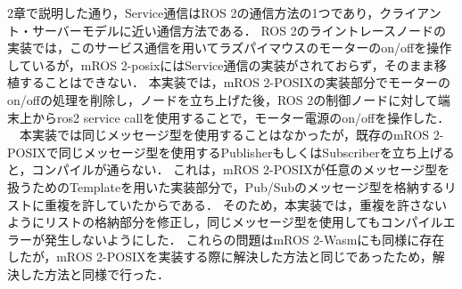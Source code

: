 2章で説明した通り，Service通信はROS 2の通信方法の1つであり，クライアント・サーバーモデルに近い通信方法である．
ROS 2のライントレースノードの実装では，このサービス通信を用いてラズパイマウスのモーターのon/offを操作しているが，mROS 2-posixにはService通信の実装がされておらず，そのまま移植することはできない．
本実装では，mROS 2-POSIXの実装部分でモーターのon/offの処理を削除し，ノードを立ち上げた後，ROS 2の制御ノードに対して端末上からros2 service callを使用することで，モーター電源のon/offを操作した．
\\　本実装では同じメッセージ型を使用することはなかったが，既存のmROS 2-POSIXで同じメッセージ型を使用するPublisherもしくはSubscriberを立ち上げると，コンパイルが通らない．
これは，mROS 2-POSIXが任意のメッセージ型を扱うためのTemplateを用いた実装部分で，Pub/Subのメッセージ型を格納するリストに重複を許していたからである．
そのため，本実装では，重複を許さないようにリストの格納部分を修正し，同じメッセージ型を使用してもコンパイルエラーが発生しないようにした．
これらの問題はmROS 2-Wasmにも同様に存在したが，mROS 2-POSIXを実装する際に解決した方法と同じであったため，解決した方法と同様で行った．
